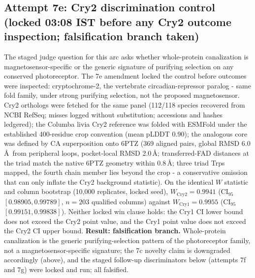 \documentclass[12pt,a4paper]{article}
\begin{document}
\subsection{Attempt 7e: Cry2 discrimination control (locked 03:08 IST before any Cry2 outcome inspection; falsification branch taken)}
The staged judge question for this arc asks whether whole-protein canalization is magnetosensor-specific or the generic signature of purifying selection on any conserved photoreceptor. The 7e amendment locked the control before outcomes were inspected: cryptochrome-2, the vertebrate circadian-repressor paralog - same fold family, under strong purifying selection, not the proposed magnetosensor. Cry2 orthologs were fetched for the same panel (112/118 species recovered from NCBI RefSeq; misses logged without substitution; accessions and hashes ledgered); the Columba livia Cry2 reference was folded with ESMFold under the established 400-residue crop convention (mean pLDDT 0.90); the analogous core was defined by CA superposition onto 6PTZ (369 aligned pairs, global RMSD 6.0\,\AA\ from peripheral loops, pocket-local RMSD 2.0\,\AA; transferred-FAD distances at the triad match the native 6PTZ geometry within 0.8\,\AA; three triad Trps mapped, the fourth chain member lies beyond the crop - a conservative omission that can only inflate the Cry2 background statistic). On the identical $W$ statistic and column bootstrap (10{,}000 replicates, locked seed), $W_{\mathrm{Cry2}} = 0.9941$ (CI$_{95}$ $[0.98905, 0.99789]$, $n=203$ qualified columns) against $W_{\mathrm{Cry1}} = 0.9955$ (CI$_{95}$ $[0.99151, 0.99838]$). Neither locked win clause holds: the Cry1 CI lower bound does not exceed the Cry2 point value, and the Cry1 point value does not exceed the Cry2 CI upper bound. \textbf{Result: falsification branch.} Whole-protein canalization is the generic purifying-selection pattern of the photoreceptor family, not a magnetosensor-specific signature; the 7c novelty claim is downgraded accordingly (above), and the staged follow-up discriminators below (attempts 7f and 7g) were locked and run; all falsified.
\end{document}
